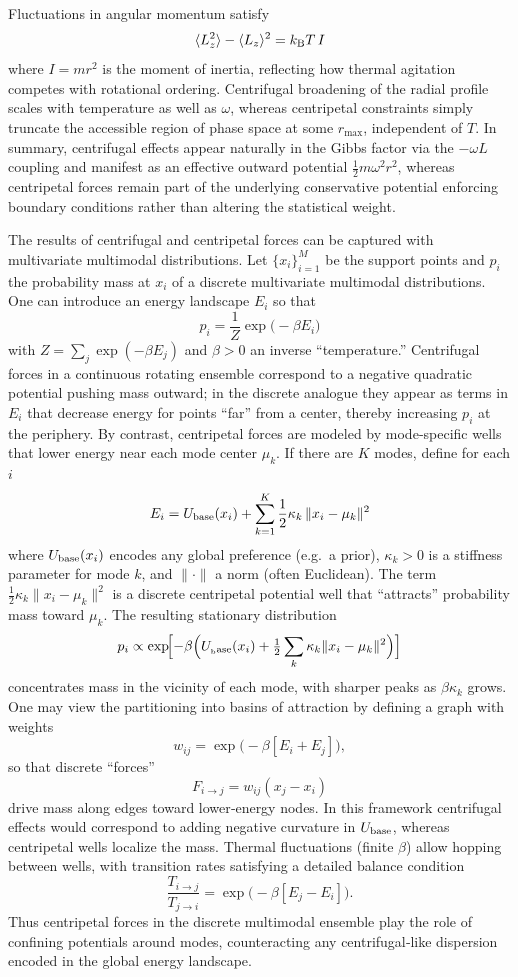 \documentclass[11pt]{article}
\begin{document}
Fluctuations in angular momentum satisfy
\[
\langle L_z^2\rangle - \langle L_z\rangle^2 = k_{\rm B}T \,I
\]
where \(I=mr^2\) is the moment of inertia, reflecting how thermal agitation competes with rotational ordering.  Centrifugal broadening of the radial profile scales with temperature as well as \(\omega\), whereas centripetal constraints simply truncate the accessible region of phase space at some \(r_{\max}\), independent of \(T\). In summary, centrifugal effects appear naturally in the Gibbs factor via the \(-\omega L\) coupling and manifest as an effective outward potential \(\tfrac12m\omega^2r^2\), whereas centripetal forces remain part of the underlying conservative potential enforcing boundary conditions rather than altering the statistical weight.

The results of centrifugal and centripetal forces can be captured with multivariate multimodal distributions. Let \(\{x_i\}_{i=1}^M\) be the support points and \(p_i\) the probability mass at \(x_i\) of a discrete multivariate multimodal distributions.  One can introduce an energy landscape \(E_i\) so that  
\[
p_i = \frac{1}{Z}\exp\bigl(-\beta E_i\bigr)
\]  
with \(Z=\sum_j\exp(-\beta E_j)\) and \(\beta>0\) an inverse “temperature.”  Centrifugal forces in a continuous rotating ensemble correspond to a negative quadratic potential pushing mass outward; in the discrete analogue they appear as terms in \(E_i\) that decrease energy for points “far” from a center, thereby increasing \(p_i\) at the periphery.  By contrast, centripetal forces are modeled by mode‐specific wells that lower energy near each mode center \(\mu_k\).  If there are \(K\) modes, define for each \(i\)  
\[
E_i = U_{\rm base}(x_i) + \sum_{k=1}^K \frac{1}{2}\kappa_k\,\|x_i-\mu_k\|^2
\]  
where \(U_{\rm base}(x_i)\) encodes any global preference (e.g.\ a prior), \(\kappa_k>0\) is a stiffness parameter for mode \(k\), and \(\|\cdot\|\) a norm (often Euclidean).  The term \(\tfrac12\kappa_k\|x_i-\mu_k\|^2\) is a discrete centripetal potential well that “attracts” probability mass toward \(\mu_k\).  The resulting stationary distribution  
\[
p_i \propto \exp\!\Bigl[-\beta\Bigl(U_{\rm_base}(x_i)+\tfrac12\sum_k\kappa_k\|x_i-\mu_k\|^2\Bigr)\Bigr]
\]  
concentrates mass in the vicinity of each mode, with sharper peaks as \(\beta\kappa_k\) grows.  One may view the partitioning into basins of attraction by defining a graph with weights  
\[
w_{ij} = \exp\bigl(-\beta[E_i+E_j]\bigr)\!,
\]  
so that discrete “forces”  
\[
F_{i\to j} = w_{ij}(x_j-x_i)
\]  
drive mass along edges toward lower‐energy nodes.  In this framework centrifugal effects would correspond to adding negative curvature in \(U_{\rm base}\), whereas centripetal wells localize the mass.  Thermal fluctuations (finite \(\beta\)) allow hopping between wells, with transition rates satisfying a detailed balance condition  
\[
\frac{T_{i\to j}}{T_{j\to i}} = \exp\bigl(-\beta[E_j-E_i]\bigr).
\]  
Thus centripetal forces in the discrete multimodal ensemble play the role of confining potentials around modes, counteracting any centrifugal‐like dispersion encoded in the global energy landscape.
\end{document}
